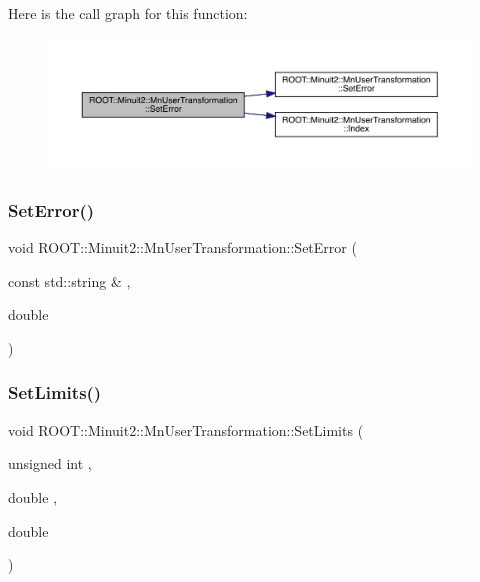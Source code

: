 Here is the call graph for this function\+:\nopagebreak
\begin{figure}[H]
\begin{center}
\leavevmode
\includegraphics[width=350pt]{d9/d98/classROOT_1_1Minuit2_1_1MnUserTransformation_ae63d2c7ee55629e691973082b1099e30_cgraph}
\end{center}
\end{figure}
\mbox{\label{classROOT_1_1Minuit2_1_1MnUserTransformation_ae63d2c7ee55629e691973082b1099e30}} 
\subsubsection{\texorpdfstring{SetError()}{SetError()}\hspace{0.1cm}{\footnotesize\ttfamily [4/4]}}
{\footnotesize\ttfamily void R\+O\+O\+T\+::\+Minuit2\+::\+Mn\+User\+Transformation\+::\+Set\+Error (\begin{DoxyParamCaption}\item[{const std\+::string \&}]{,  }\item[{double}]{ }\end{DoxyParamCaption})}

\mbox{\label{classROOT_1_1Minuit2_1_1MnUserTransformation_ad45b1ae620fbf8ca9f77846b80cca808}} 
\subsubsection{\texorpdfstring{SetLimits()}{SetLimits()}\hspace{0.1cm}{\footnotesize\ttfamily [1/4]}}
{\footnotesize\ttfamily void R\+O\+O\+T\+::\+Minuit2\+::\+Mn\+User\+Transformation\+::\+Set\+Limits (\begin{DoxyParamCaption}\item[{unsigned int}]{,  }\item[{double}]{,  }\item[{double}]{ }\end{DoxyParamCaption})}

